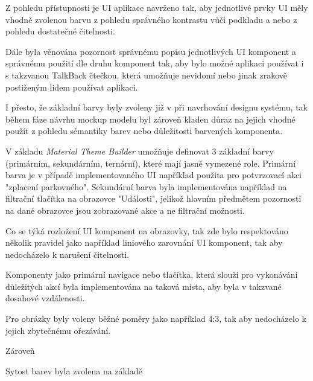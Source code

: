 \begin{minipage}[t]{0.45\textwidth}

\bigskip
{}
Z pohledu přístupnosti je UI aplikace navrženo tak, aby jednotlivé prvky UI měly vhodně zvolenou barvu z pohledu
správného kontrastu vůči podkladu a nebo z pohledu dostatečné čitelnosti.

Dále byla věnována pozornost správnému popisu jednotlivých UI komponent a správnému použití dle druhu komponent tak, aby bylo možné aplikaci používat i s 
takzvanou TalkBack čtečkou, která umožňuje nevidomí nebo jinak zrakově postiženým lidem používat aplikaci.

\bigskip
{}
I přesto, že základní barvy byly zvoleny již v při navrhování designu systému, tak během fáze návrhu mockup modelu byl zároveň kladen důraz na jejich 
vhodné použít z pohledu sémantiky barev nebo důležitosti barvených komponenta.

V základu \textit{Material Theme Builder} umožňuje definovat 3 základní barvy (primárním, sekundárním, ternární), které mají jasně vymezené role.
Primární barva je v případě implementovaného UI například použita pro potvrzovací akci "zplacení parkovného". Sekundární barva byla
implementována například na filtrační tlačítka na obrazovce "Události", jelikož hlavním předmětem pozornosti na dané obrazovce 
jsou zobrazované akce a ne filtrační možnosti.

\bigskip

Co se týká rozložení UI komponent na obrazovky, tak zde bylo respektováno několik pravidel jako například liniového zarovnání UI komponent, tak aby nedocházelo
k narušení čitelnosti.

Komponenty jako primární navigace nebo tlačítka, která slouží pro vykonávání důležitých akcí byla implementována na taková místa, aby byla v takzvané dosahové vzdálenosti.

Pro obrázky byly voleny běžné poměry jako například 4:3, tak aby nedocházelo k jejich zbytečnému ořezávání.

Zároveň 

 Sytost barev byla zvolena na základě
\end{minipage}
\hfill
